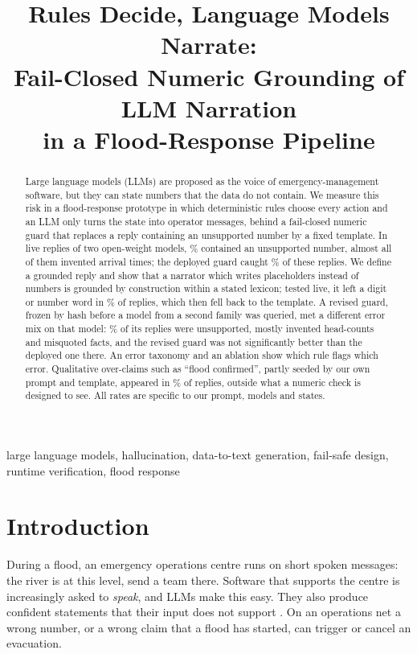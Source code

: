 \documentclass[conference]{IEEEtran}
\begin{document}
\title{Rules Decide, Language Models Narrate:\\
Fail-Closed Numeric Grounding of LLM Narration\\
in a Flood-Response Pipeline}

\author{
}

\maketitle

\begin{abstract}
Large language models (LLMs) are proposed as the voice of emergency-management software, but they can state numbers that the data do not contain. We measure this risk in a flood-response prototype in which deterministic rules choose every action and an LLM only turns the state into operator messages, behind a fail-closed numeric guard that replaces a reply containing an unsupported number by a fixed template. In \LiveN{} live replies of two open-weight models, \LiveUnsupPct\% contained an unsupported number, almost all of them invented arrival times; the deployed guard caught \LiveDepRec\% of these replies. We define a grounded reply and show that a narrator which writes placeholders instead of numbers is grounded by construction within a stated lexicon; tested live, it left a digit or number word in \VarSlotsViol\% of replies, which then fell back to the template. A revised guard, frozen by hash before a model from a second family was queried, met a different error mix on that model: \HoUnsupPct\% of its replies were unsupported, mostly invented head-counts and misquoted facts, and the revised guard was not significantly better than the deployed one there. An error taxonomy and an ablation show which rule flags which error. Qualitative over-claims such as ``flood confirmed'', partly seeded by our own prompt and template, appeared in \OcDevPct\% of replies, outside what a numeric check is designed to see. All rates are specific to our prompt, models and states.
\end{abstract}

\begin{IEEEkeywords}
large language models, hallucination, data-to-text generation, fail-safe design, runtime verification, flood response
\end{IEEEkeywords}

\section{Introduction}
During a flood, an emergency operations centre runs on short spoken messages: the river is at this level, send a team there. Software that supports the centre is increasingly asked to \emph{speak}, and LLMs make this easy. They also produce confident statements that their input does not support \cite{Ji2023}. On an operations net a wrong number, or a wrong claim that a flood has started, can trigger or cancel an evacuation.
\end{document}
